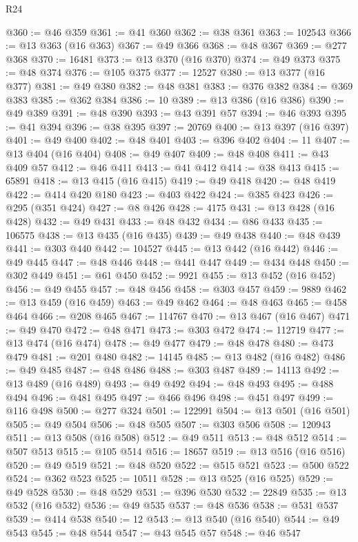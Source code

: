 \begin{lexlean}{R24}
\begin{coremodule}
@360 := @46 @359
@361 := @41 @360
@362 := @38 @361
@363 := 102543
@366 := @13 @363 (@16 @363)
@367 := @49 @366
@368 := @48 @367
@369 := @277 @368
@370 := 16481
@373 := @13 @370 (@16 @370)
@374 := @49 @373
@375 := @48 @374
@376 := @105 @375
@377 := 12527
@380 := @13 @377 (@16 @377)
@381 := @49 @380
@382 := @48 @381
@383 := @376 @382
@384 := @369 @383
@385 := @362 @384
@386 := 10
@389 := @13 @386 (@16 @386)
@390 := @49 @389
@391 := @48 @390
@393 := @43 @391 @57
@394 := @46 @393
@395 := @41 @394
@396 := @38 @395
@397 := 20769
@400 := @13 @397 (@16 @397)
@401 := @49 @400
@402 := @48 @401
@403 := @396 @402
@404 := 11
@407 := @13 @404 (@16 @404)
@408 := @49 @407
@409 := @48 @408
@411 := @43 @409 @57
@412 := @46 @411
@413 := @41 @412
@414 := @38 @413
@415 := 65891
@418 := @13 @415 (@16 @415)
@419 := @49 @418
@420 := @48 @419
@422 := @414 @420 @180
@423 := @403 @422
@424 := @385 @423
@426 := @295 (@351 @424)
@427 := @8 @426
@428 := 4175
@431 := @13 @428 (@16 @428)
@432 := @49 @431
@433 := @48 @432
@434 := @86 @433
@435 := 106575
@438 := @13 @435 (@16 @435)
@439 := @49 @438
@440 := @48 @439
@441 := @303 @440
@442 := 104527
@445 := @13 @442 (@16 @442)
@446 := @49 @445
@447 := @48 @446
@448 := @441 @447
@449 := @434 @448
@450 := @302 @449
@451 := @61 @450
@452 := 9921
@455 := @13 @452 (@16 @452)
@456 := @49 @455
@457 := @48 @456
@458 := @303 @457
@459 := 9889
@462 := @13 @459 (@16 @459)
@463 := @49 @462
@464 := @48 @463
@465 := @458 @464
@466 := @208 @465
@467 := 114767
@470 := @13 @467 (@16 @467)
@471 := @49 @470
@472 := @48 @471
@473 := @303 @472
@474 := 112719
@477 := @13 @474 (@16 @474)
@478 := @49 @477
@479 := @48 @478
@480 := @473 @479
@481 := @201 @480
@482 := 14145
@485 := @13 @482 (@16 @482)
@486 := @49 @485
@487 := @48 @486
@488 := @303 @487
@489 := 14113
@492 := @13 @489 (@16 @489)
@493 := @49 @492
@494 := @48 @493
@495 := @488 @494
@496 := @481 @495
@497 := @466 @496
@498 := @451 @497
@499 := @116 @498
@500 := @277 @324
@501 := 122991
@504 := @13 @501 (@16 @501)
@505 := @49 @504
@506 := @48 @505
@507 := @303 @506
@508 := 120943
@511 := @13 @508 (@16 @508)
@512 := @49 @511
@513 := @48 @512
@514 := @507 @513
@515 := @105 @514
@516 := 18657
@519 := @13 @516 (@16 @516)
@520 := @49 @519
@521 := @48 @520
@522 := @515 @521
@523 := @500 @522
@524 := @362 @523
@525 := 10511
@528 := @13 @525 (@16 @525)
@529 := @49 @528
@530 := @48 @529
@531 := @396 @530
@532 := 22849
@535 := @13 @532 (@16 @532)
@536 := @49 @535
@537 := @48 @536
@538 := @531 @537
@539 := @414 @538
@540 := 12
@543 := @13 @540 (@16 @540)
@544 := @49 @543
@545 := @48 @544
@547 := @43 @545 @57
@548 := @46 @547

\end{coremodule}
\end{lexlean}
